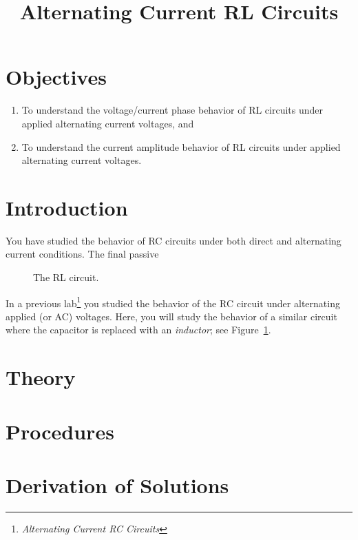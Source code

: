 \documentclass[12pt]{article}
\title{Alternating Current RL Circuits}
\author{}
\date{}
\begin{document}
\maketitle

\section{Objectives}
\label{sec:objectives}

\begin{enumerate}
\item To understand the voltage/current phase behavior of RL circuits
  under applied alternating current voltages, and
\item To understand the current amplitude behavior of RL circuits
  under applied alternating current voltages.
\end{enumerate}

\section{Introduction}
\label{sec:introduction}

You have studied the behavior of RC circuits under both direct
and alternating current conditions.  The final passive

\begin{figure}
  \centering
  \caption{The RL circuit.}
  \label{fig:rlcircuit}
\end{figure}
In a previous lab\footnote{\textit{Alternating Current RC Circuits}}
you studied the behavior of the RC circuit under alternating applied
(or AC) voltages.  Here, you will study the behavior of a similar
circuit where the capacitor is replaced with an \textit{inductor}; see
Figure~\ref{fig:rlcircuit}. 

\section{Theory}
\label{sec:theory}

\section{Procedures}
\label{sec:procedures}


\appendix

\section{Derivation of Solutions}
\label{sec:solutions}
\end{document}
